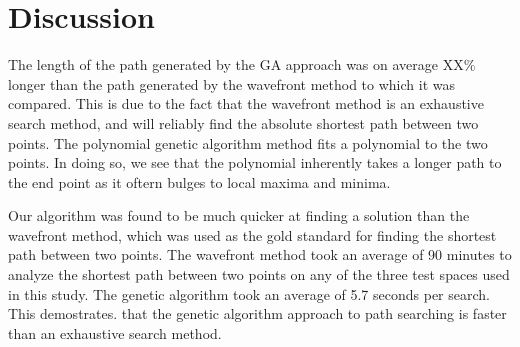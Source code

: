 	
	
\section{Discussion}

The length of the path generated by the GA approach was on average XX\% longer than the path generated by the wavefront method to which it was compared. This is due to the fact that the wavefront method is an exhaustive search method, and will reliably find the absolute shortest path between two points. The polynomial genetic algorithm method fits a polynomial to the two points. In doing so, we see that the polynomial inherently takes a longer path to the end point as it oftern bulges to local maxima and minima.

Our algorithm was found to be much quicker at finding a solution than the wavefront method, which was used as the gold standard for finding the shortest path between two points. The wavefront method took an average of 90 minutes to analyze the shortest path between two points on any of the three test spaces used in this study. The genetic algorithm took an average of 5.7 seconds per search. This demostrates. that the genetic algorithm approach to path searching is faster than an exhaustive search method.

